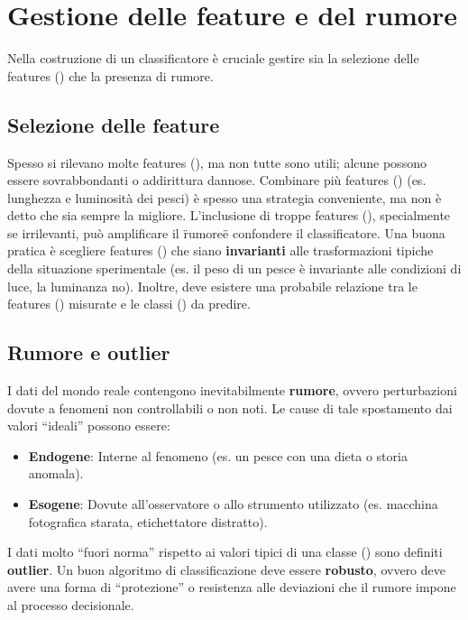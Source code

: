 \section{Gestione delle feature e del rumore}

Nella costruzione di un classificatore è cruciale gestire
sia la selezione delle features () che la presenza di rumore.

\subsection{Selezione delle feature}
Spesso si rilevano molte features (), ma non tutte sono utili;
alcune possono essere sovrabbondanti o addirittura dannose.
Combinare più features () (es. lunghezza e luminosità dei pesci)
è spesso una strategia conveniente, ma non è detto che
sia sempre la migliore.
L'inclusione di troppe features (), specialmente se irrilevanti,
può amplificare il \"rumore\" e confondere il classificatore.
Una buona pratica è scegliere features () che siano
\textbf{invarianti} alle trasformazioni tipiche della
situazione sperimentale (es. il peso di un pesce è
invariante alle condizioni di luce, la luminanza no).
Inoltre, deve esistere una probabile relazione tra le
features () misurate e le classi () da predire.

\subsection{Rumore e outlier}
I dati del mondo reale contengono inevitabilmente
\textbf{rumore}, ovvero perturbazioni dovute a fenomeni
non controllabili o non noti. Le cause di tale
spostamento dai valori ``ideali'' possono essere:
\begin{itemize}
    \item \textbf{Endogene}: Interne al fenomeno (es. un pesce
    con una dieta o storia anomala).
    \item \textbf{Esogene}: Dovute all'osservatore o allo
    strumento utilizzato (es. macchina fotografica starata,
    etichettatore distratto).
\end{itemize}

I dati molto ``fuori norma'' rispetto ai valori tipici di una classe
() sono definiti \textbf{outlier}.
Un buon algoritmo di classificazione deve essere
\textbf{robusto}, ovvero deve avere una forma di
``protezione'' o resistenza alle deviazioni che il rumore
impone al processo decisionale.

